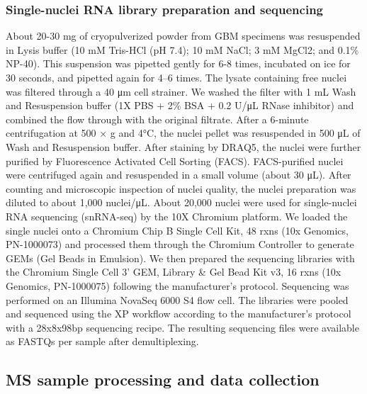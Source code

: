 \subsubsection{Single-nuclei RNA library preparation and sequencing}
About 20-30 mg of cryopulverized powder from GBM specimens was resuspended in Lysis buffer (10 mM Tris-HCl (pH 7.4); 10 mM NaCl; 3 mM MgCl2; and 0.1\% NP-40). This suspension was pipetted gently for 6-8 times, incubated on ice for 30 seconds, and pipetted again for 4--6 times. The lysate containing free nuclei was filtered through a 40 μm cell strainer. We washed the filter with 1 mL Wash and Resuspension buffer (1X PBS + 2\% BSA + 0.2 U/μL RNase inhibitor) and combined the flow through with the original filtrate. After a 6-minute centrifugation at 500 × g and 4°C, the nuclei pellet was resuspended in 500 μL of Wash and Resuspension buffer. After staining by DRAQ5, the nuclei were further purified by Fluorescence Activated Cell Sorting (FACS). FACS-purified nuclei were centrifuged again and resuspended in a small volume (about 30 μL). After counting and microscopic inspection of nuclei quality, the nuclei preparation was diluted to about 1,000 nuclei/μL. About 20,000 nuclei were used for single-nuclei RNA sequencing (snRNA-seq) by the 10X Chromium platform. We loaded the single nuclei onto a Chromium Chip B Single Cell Kit, 48 rxns (10x Genomics, PN-1000073) and processed them through the Chromium Controller to generate GEMs (Gel Beads in Emulsion). We then prepared the sequencing libraries with the Chromium Single Cell 3' GEM, Library \& Gel Bead Kit v3, 16 rxns (10x Genomics, PN-1000075) following the manufacturer’s protocol. Sequencing was performed on an Illumina NovaSeq 6000 S4 flow cell. The libraries were pooled and sequenced using the XP workflow according to the manufacturer's protocol with a 28x8x98bp sequencing recipe. The resulting sequencing files were available as FASTQs per sample after demultiplexing.


\subsection{MS sample processing and data collection}

